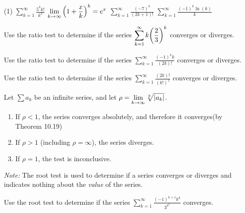 \documentclass[../mathNotesPreamble]{subfiles}
\begin{document}
  \begin{tasks}[after-item-skip=\stretch{1}, label=,item-indent=0pt](1)
    \task $\displaystyle\sum_{k=1}^\infty \frac{5^k k!}{k^k}$  $\displaystyle\lim_{k\to \infty} {\left(1+\frac{x}{k}\right)}^k=e^x$
    \task $\displaystyle\sum_{k=1}^\infty \frac{(-7)^k}{(2k+1)!}$
    \task $\displaystyle\sum_{k=1}^\infty \frac{(-1)^k\ln(k)}{k}$
  \end{tasks}
  \pagebreak

  \begin{ex*}
    Use the ratio test to determine if the series $\displaystyle\sum_{k=1}^\infty k{\left(\frac{2}{3}\right)}^k$ converges or diverges.
  \end{ex*}
  \pagebreak

  \begin{ex*}
    Use the ratio test to determine if the series $\displaystyle\sum_{k=1}^\infty \frac{(-1)^k k}{(2k)!}$ converges or diverges.
  \end{ex*}
  \pagebreak

  \begin{ex*}
    Use the ratio test to determine if the series $\displaystyle\sum_{k=1}^\infty \frac{(2k)!}{(k!)^2}$ converges or diverges.
  \end{ex*}
  \pagebreak

  \begin{thmBox*}
    Let $\sum a_k$ be an infinite series, and let $\displaystyle\rho=\lim_{k\to \infty} \sqrt[k]{{\left\vert a_k\right\vert}}$.
    \begin{enumerate}
      \item If $\rho<1$, the series converges absolutely, and therefore it converges\newline (by Theorem 10.19)
      \item If $\rho>1$ (including $\rho=\infty$), the series diverges.
      \item If $\rho=1$, the test is inconclusive.
    \end{enumerate}
  \end{thmBox*}
  \noindent\textit{Note:} The root test is used to determine if a series converges or diverges and indicates nothing about the \textit{value} of the series.
  \begin{ex*}
    Use the root test to determine if the series $\displaystyle\sum_{k=1}^\infty \frac{(-1)^{k+1} k^k}{3^{k^2}}$ converges.
  \end{ex*}
  \pagebreak
\end{document}
